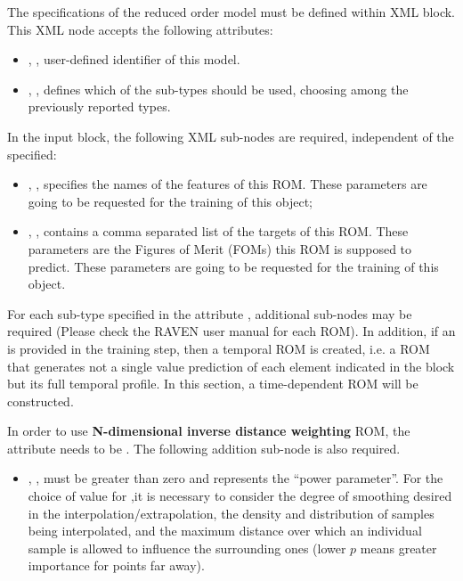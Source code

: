 The specifications of the reduced order model must be defined within  XML block. This XML node accepts
the following attributes:

\begin{itemize}
  \itemsep0em
  \item {}, , user-defined identifier of this model.
  \item {}, , defines which of
  the sub-types should be used, choosing among the previously reported types.
\end{itemize}
\vspace{-5mm}

In the  input block, the following XML sub-nodes are required,
independent of the  specified:
%
\begin{itemize}
   \item {}, , specifies the names of the features
     of this ROM. \nb These parameters are going to be requested for the training of this object;
    \item {}, , contains a comma separated list of
      the targets of this ROM. These parameters are the Figures of Merit (FOMs) this ROM is supposed to predict.
      \nb These parameters are going to be requested for the training of this object.
\end{itemize}

For each sub-type specified in the attribute , additional sub-nodes may be required (Please check
the RAVEN user manual for each ROM). In addition, if an  is provided in the training step, then
a temporal ROM is created, i.e. a ROM that generates not a single value prediction of each element indicated in
the  block but its full temporal profile. In this section, a time-dependent ROM will be constructed.

In order to use \textbf{N-dimensional inverse distance weighting} ROM, the  attribute 
needs to be . The following addition sub-node is also required.

\begin{itemize}
  \item {}, , must be greater than zero and represents the
    ``power parameter''. For the choice of value for ,it is necessary to consider the degree
    of smoothing desired in the interpolation/extrapolation, the density and distribution of samples being
    interpolated, and the maximum distance over which an individual sample is allowed to influence the
    surrounding ones (lower $p$ means greater importance for points far away).
\end{itemize}

